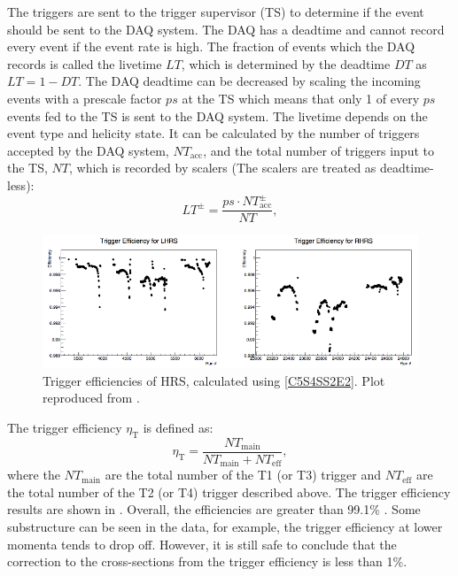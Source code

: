 The triggers are sent to the trigger supervisor (TS) to determine if the event should be sent to the DAQ system. The DAQ has a deadtime and cannot record every event if the event rate is high. The fraction of events which the DAQ records is called the livetime $LT$, which is determined by the deadtime $DT$ as $LT=1-DT$. The DAQ deadtime can be decreased by scaling the incoming events with a prescale factor $ps$ at the TS which means that only 1 of every $ps$ events fed to the TS is sent to the DAQ system. The livetime depends on the event type and helicity state. It can be calculated by the number of triggers accepted by the DAQ system, $NT_{\mathrm{acc}}$, and the total number of triggers input to the TS, $NT$,  which is recorded by scalers (The scalers are treated as deadtime-less):
\begin{equation} \label{C5S4SS2E1}
LT^{\pm} = \frac{ps\cdot NT_{\mathrm{acc}}^{\pm}}{NT},
\end{equation}

\begin{figure}[tb!]
  \centering
  \includegraphics[width=\textwidth]{figs/trigger-efficiency.png}
  \caption[Trigger efficiencies of HRS.]{Trigger efficiencies of HRS, calculated using \cref{C5S4SS2E2}. Plot reproduced from \cite{Zielinski2014a}. \label{C5S4SS2F3}}
\end{figure}

The trigger efficiency $\eta_{\mathrm{T}}$ is defined as:
\begin{equation} \label{C5S4SS2E2}
\eta_{\mathrm{T}} = \frac{NT_{\mathrm{main}}}{NT_{\mathrm{main}}+NT_{\mathrm{eff}}},
\end{equation}
where the $NT_{\mathrm{main}}$ are the total number of the T1 (or T3) trigger and $NT_{\mathrm{eff}}$ are the total number of the T2 (or T4) trigger described above. The trigger efficiency results are shown in . Overall, the efficiencies are greater than 99.1\% \cite{Zielinski2014a}. Some substructure can be seen in the data, for example, the trigger efficiency at lower momenta tends to drop off. However, it is still safe to conclude that the correction to the cross-sections from the trigger efficiency is less than 1\%.

